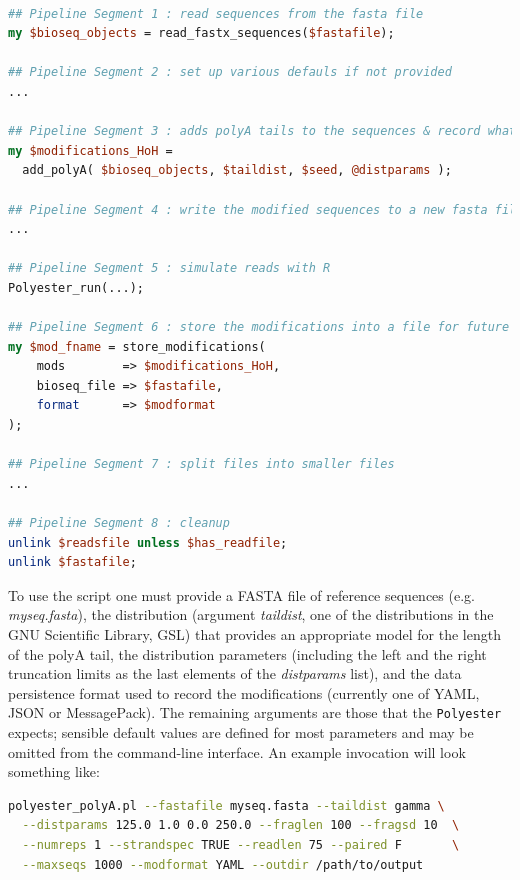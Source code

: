 \documentclass[10pt]{article}
\begin{document}
\begin{lstlisting}[language=Perl,basicstyle=\footnotesize,frame=single,caption={Pipeline logic of the \texttt{polyester\_polyA.pl} application.},label={lst:EdlibPipeline},captionpos=b]

## Pipeline Segment 1 : read sequences from the fasta file
my $bioseq_objects = read_fastx_sequences($fastafile);

## Pipeline Segment 2 : set up various defauls if not provided
...

## Pipeline Segment 3 : adds polyA tails to the sequences & record what was done
my $modifications_HoH =
  add_polyA( $bioseq_objects, $taildist, $seed, @distparams );

## Pipeline Segment 4 : write the modified sequences to a new fasta file
...

## Pipeline Segment 5 : simulate reads with R
Polyester_run(...);

## Pipeline Segment 6 : store the modifications into a file for future use
my $mod_fname = store_modifications(
    mods        => $modifications_HoH,
    bioseq_file => $fastafile,
    format      => $modformat
);

## Pipeline Segment 7 : split files into smaller files
...

## Pipeline Segment 8 : cleanup
unlink $readsfile unless $has_readfile;
unlink $fastafile;
\end{lstlisting}

To use the script one must provide a FASTA file of reference sequences (e.g. \textit{myseq.fasta}), the distribution (argument \textit{taildist}, one of the distributions in the GNU Scientific Library, GSL) that provides an appropriate model for the length of the polyA tail, the distribution parameters (including the left and the right truncation limits as the last elements of the \textit{distparams} list), and the data persistence format used to record the modifications (currently one of YAML, JSON or MessagePack). The remaining arguments are those that the \texttt{Polyester} expects; sensible default values are defined for most parameters and may be omitted from the command-line interface. An example invocation will look something like:

\begin{lstlisting}[language=bash,basicstyle=\footnotesize]
  polyester_polyA.pl --fastafile myseq.fasta --taildist gamma \
  --distparams 125.0 1.0 0.0 250.0 --fraglen 100 --fragsd 10  \
  --numreps 1 --strandspec TRUE --readlen 75 --paired F       \
  --maxseqs 1000 --modformat YAML --outdir /path/to/output
\end{lstlisting}
\end{document}
